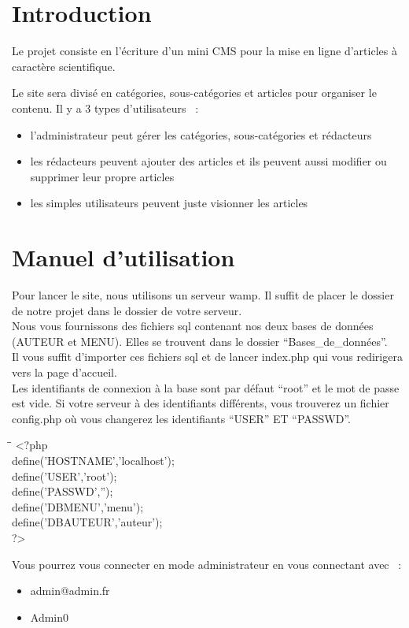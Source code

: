 \documentclass[hidelinks, 12pt,a4paper]{article}
\begin{document}
\newpage
\tableofcontents

\newpage
\section{Introduction}
Le projet consiste en l'écriture d'un mini CMS pour la mise en ligne d'articles à caractère scientifique.

Le site sera divisé en catégories, sous-catégories et articles pour organiser le contenu.
Il y a 3 types d'utilisateurs ~:\\ 
\begin{itemize}
\item l'administrateur peut gérer les catégories, sous-catégories et rédacteurs
\item les rédacteurs peuvent ajouter des articles et ils peuvent aussi modifier ou supprimer leur propre articles 
\item les simples utilisateurs peuvent juste visionner les articles
\end{itemize}

\newpage
\section{Manuel d'utilisation}
Pour lancer le site, nous utilisons un serveur wamp. Il suffit de placer le dossier de notre projet dans le dossier de votre serveur.\\

Nous vous fournissons des fichiers sql contenant nos deux bases de données (AUTEUR et MENU). Elles se trouvent dans le dossier ``Bases\_de\_données''.\\

Il vous suffit d'importer ces fichiers sql et de lancer index.php qui vous redirigera vers la page d'accueil.\\

Les identifiants de connexion à la base sont par défaut ``root'' et le mot de passe est vide. Si votre serveur à des identifiants différents, vous trouverez un fichier config.php où vous changerez les identifiants ``USER'' ET ``PASSWD''.\\

\begin{tabbing}
\hspace{2cm}\=\hspace{2cm}\=\kill
<?php\\
\>	define('HOSTNAME','localhost');\\
\>	define('USER','root');\\
\>	define('PASSWD','');\\
\>	define('DBMENU','menu');\\
\>	define('DBAUTEUR','auteur');\\
?>\\
\end{tabbing} 
Vous pourrez vous connecter en mode administrateur en vous connectant avec ~:
\begin{itemize}
\item admin@admin.fr
\item Admin0\\
\end{itemize}
\end{document}
